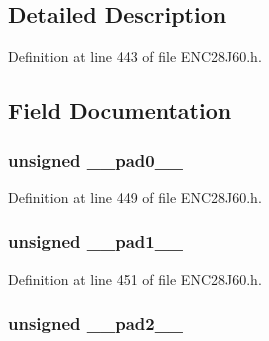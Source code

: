 \begin{DoxyCompactItemize}
\begin{tabbing}
\end{tabbing}\end{DoxyCompactItemize}


\subsection{Detailed Description}


Definition at line 443 of file E\+N\+C28\+J60.\+h.



\subsection{Field Documentation}
\hypertarget{union_p_h_y_r_e_g_adf71f3d8410c1f1dbbc96680a92c49af}{}
\subsubsection[{\+\_\+\+\_\+pad0\+\_\+\+\_\+}]{\setlength{\rightskip}{0pt plus 5cm}unsigned \+\_\+\+\_\+pad0\+\_\+\+\_\+}\label{union_p_h_y_r_e_g_adf71f3d8410c1f1dbbc96680a92c49af}


Definition at line 449 of file E\+N\+C28\+J60.\+h.

\hypertarget{union_p_h_y_r_e_g_acaf2d0924a107ec6e8d2e31febaf66f9}{}
\subsubsection[{\+\_\+\+\_\+pad1\+\_\+\+\_\+}]{\setlength{\rightskip}{0pt plus 5cm}unsigned \+\_\+\+\_\+pad1\+\_\+\+\_\+}\label{union_p_h_y_r_e_g_acaf2d0924a107ec6e8d2e31febaf66f9}


Definition at line 451 of file E\+N\+C28\+J60.\+h.

\hypertarget{union_p_h_y_r_e_g_a4d97cc5f7d51d22fc2bf3eab35c9cb7f}{}
\subsubsection[{\+\_\+\+\_\+pad2\+\_\+\+\_\+}]{\setlength{\rightskip}{0pt plus 5cm}unsigned \+\_\+\+\_\+pad2\+\_\+\+\_\+}\label{union_p_h_y_r_e_g_a4d97cc5f7d51d22fc2bf3eab35c9cb7f}


